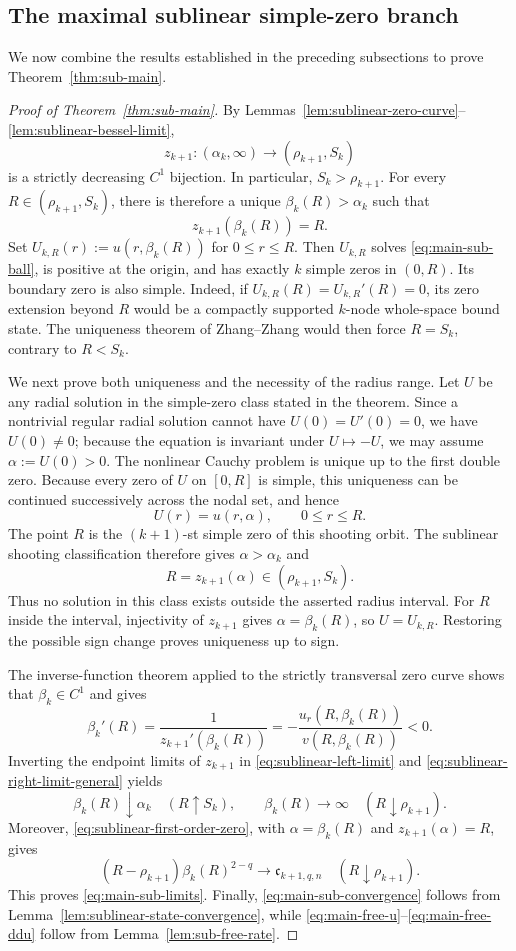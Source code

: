 \documentclass[11pt]{article}
\begin{document}
\subsection{The maximal sublinear simple-zero branch}
We now combine the results established in the preceding subsections to prove Theorem~\ref{thm:sub-main}.
\begin{proof}[Proof of Theorem~\ref{thm:sub-main}]
{
By Lemmas~\ref{lem:sublinear-zero-curve}--\ref{lem:sublinear-bessel-limit},
\[
 z_{k+1}:(\alpha_k,\infty)\longrightarrow
 (\rho_{k+1},S_k)
\]
is a strictly decreasing $C^1$ bijection.  In particular,
$S_k>\rho_{k+1}$.  For every
$R\in(\rho_{k+1},S_k)$, there is therefore a unique
$\beta_k(R)>\alpha_k$ such that
\[
 z_{k+1}(\beta_k(R))=R.
\]
Set $U_{k,R}(r):=u(r,\beta_k(R))$ for $0\le r\le R$.
Then $U_{k,R}$ solves \eqref{eq:main-sub-ball}, is positive at the
origin, and has exactly $k$ simple zeros in $(0,R)$.  Its boundary
zero is also simple.  Indeed, if
$U_{k,R}(R)=U_{k,R}'(R)=0$, its zero extension beyond $R$ would be a
compactly supported $k$-node whole-space {bound state}.  The uniqueness
theorem of Zhang--Zhang \cite{ZhangZhang} would then force
$R=S_k$, contrary to $R<S_k$.

We next prove both uniqueness and the necessity of the radius range.
Let $U$ be any radial solution in the simple-zero class stated in the
theorem.  Since a nontrivial regular radial solution cannot have
$U(0)=U'(0)=0$, we have $U(0)\ne0$; {because the equation is invariant under $U\mapsto -U$}, we may assume
$\alpha:=U(0)>0$.  The nonlinear Cauchy problem is unique up to the
first double zero.  Because every zero of $U$ on $[0,R]$ is simple,
this uniqueness can be continued successively across the nodal set,
and hence
\[
 U(r)=u(r,\alpha),\qquad 0\le r\le R.
\]
The point $R$ is the $(k+1)$-st simple zero of this shooting orbit.
The sublinear shooting classification therefore gives
$\alpha>\alpha_k$ and
\[
 R=z_{k+1}(\alpha)\in(\rho_{k+1},S_k).
\]
Thus no {solution} in this class exists outside the asserted radius
interval.  For $R$ inside the interval, injectivity of $z_{k+1}$ gives
$\alpha=\beta_k(R)$, so $U=U_{k,R}$.  {Restoring the possible sign change proves uniqueness up to sign.}

The inverse-function theorem {applied to the strictly transversal zero
curve shows that $\beta_k\in C^1$ and} gives
\[
 \beta_k'(R)=\frac{1}{z_{k+1}'(\beta_k(R))}
 =-\frac{u_r(R,\beta_k(R))}{v(R,\beta_k(R))}<0.
\]
Inverting the endpoint limits of $z_{k+1}$ in \eqref{eq:sublinear-left-limit} and \eqref{eq:sublinear-right-limit-general} yields
\[
 \beta_k(R)\downarrow\alpha_k\quad(R\uparrow S_k),
 \qquad
 \beta_k(R)\to\infty\quad(R\downarrow\rho_{k+1}).
\]
Moreover, \eqref{eq:sublinear-first-order-zero}, with
$\alpha=\beta_k(R)$ and $z_{k+1}(\alpha)=R$, gives
\[
 (R-\rho_{k+1})\beta_k(R)^{2-q}
 \longrightarrow\mathfrak c_{k+1,q,n}
 \quad(R\downarrow\rho_{k+1}).
\]
This proves \eqref{eq:main-sub-limits}.  Finally,
\eqref{eq:main-sub-convergence} follows from
Lemma~\ref{lem:sublinear-state-convergence}, while
\eqref{eq:main-free-u}--\eqref{eq:main-free-ddu} follow from
Lemma~\ref{lem:sub-free-rate}.
}
\end{proof}
\end{document}

